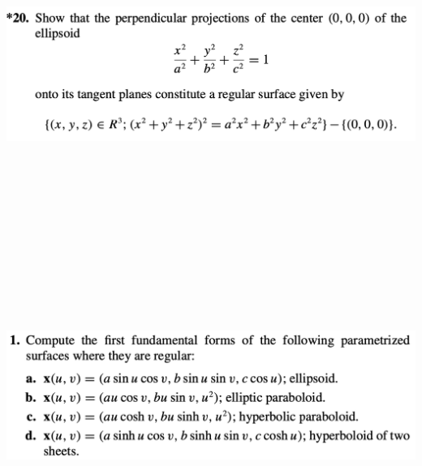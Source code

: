 \documentclass{report}
\begin{document}
\begin{question}{}{}
\includegraphics[height=10cm,width=18cm]{hwextra}
\end{question}
\begin{question}{}{}
\includegraphics[height=10cm,width=18cm]{hw4q8}
\end{question}
\end{document}
